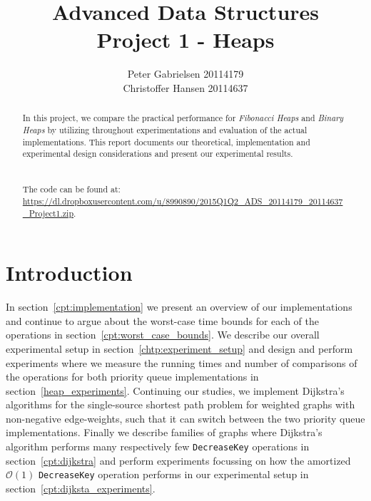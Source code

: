 \documentclass[a4paper,oneside,article,11pt]{memoir}
\title{Advanced Data Structures \\ Project 1 - Heaps}
\author{Peter Gabrielsen 20114179 \\
Christoffer Hansen 20114637}
\begin{document}
\begin{titlingpage}
\clearpage

\maketitle
\thispagestyle{empty}

\begin{abstract}
In this project, we compare the practical performance for \textit{Fibonacci Heaps} and \textit{Binary Heaps} by utilizing throughout experimentations and evaluation of the actual implementations. This report documents our theoretical, implementation and experimental design considerations and present our experimental results.\\
\\
\\
The code can be found at: \\\url{https://dl.dropboxusercontent.com/u/8990890/2015Q1Q2_ADS_20114179_20114637_Project1.zip}.
\end{abstract}
\end{titlingpage}

\pagebreak

\tableofcontents

\pagebreak

\chapter{Introduction}
In section~\ref{cpt:implementation} we present an overview of our implementations and continue to argue about the worst-case time bounds for each of the operations in section~\ref{cpt:worst_case_bounds}. We describe our overall experimental setup in section~\ref{chtp:experiment_setup} and design and perform experiments where we measure the running times and number of comparisons of the operations for both priority queue implementations in section~\ref{heap_experiments}. Continuing our studies, we implement Dijkstra's algorithms for the single-source shortest path problem for weighted graphs with non-negative edge-weights, such that it can switch between the two priority queue implementations. Finally we describe families of graphs where Dijkstra's algorithm performs many respectively few \texttt{DecreaseKey} operations in section~\ref{cpt:dijkstra} and perform experiments focussing on how the amortized $\mathcal{O}(1)$ \texttt{DecreaseKey} operation performs in our experimental setup in section~\ref{cpt:dijksta_experiments}.
\end{document}
